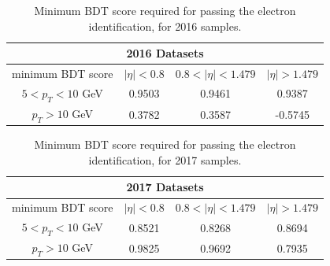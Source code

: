 \begin{table}[h!]
    \centering
    \begin{tabular}{c|c c c}
\hline
\multicolumn{4}{|c|}{2016 Datasets}                                                                 \\
\hline %
minimum BDT score    &  $|\eta| < 0.8 $ & $0.8 < |\eta| < 1.479$ 	& $|\eta| > 1.479$      \\
\hline %
$ 5 < p_T < 10 $ GeV &  0.9503      & 0.9461  	& 0.9387		\\
$p_T > 10$ GeV         &  0.3782	& 0.3587		&  -0.5745	\\
\hline %
\hline %
     \end{tabular}
\small
    \caption{Minimum BDT score required for passing the electron identification, for 2016 samples.}%
    \label{tab:ele_ID_WPA}
\end{table}

\begin{table}[h!]
    \centering
    \begin{tabular}{c|c c c}
\hline
\multicolumn{4}{|c|}{2017 Datasets}                                                                 \\
\hline %
minimum BDT score    &  $|\eta| < 0.8 $ & $0.8 < |\eta| < 1.479$ 	& $|\eta| > 1.479$      \\
\hline %
$ 5 < p_T < 10 $ GeV &  0.8521    & 0.8268  	& 0.8694		\\
$p_T > 10$ GeV         &  0.9825    & 0.9692	& 0.7935	\\
\hline %
\hline %
     \end{tabular}
\small
    \caption{Minimum BDT score required for passing the electron identification, for 2017 samples.}%
    \label{tab:ele_ID_WPB}
\end{table}

